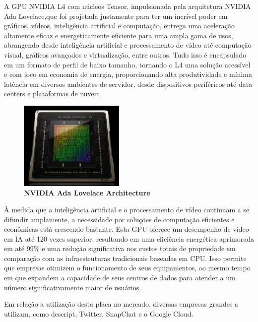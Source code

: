 \documentclass[conference]{IEEEtran}
\begin{document}
\par A GPU NVIDIA L4 com núcleos Tensor, impulsionada pela arquitetura NVIDIA Ada Lovelace,que foi projetada justamente para ter um incrível poder em gráficos, vídeos, inteligência artificial e computação, entrega uma aceleração altamente eficaz e energeticamente eficiente para uma ampla gama de usos, abrangendo desde inteligência artificial e processamento de vídeo até computação visual, gráficos avançados e virtualização, entre outros. Tudo isso é encapsulado em um formato de perfil de baixo tamanho, tornando o L4 uma solução acessível e com foco em economia de energia, proporcionando alta produtividade e mínima latência em diversos ambientes de servidor, desde dispositivos periféricos até data centers e plataformas de nuvem.



\begin{figure}[h]
\centerline{\includegraphics[width = 2.0in]{Screenshot 2023-08-21 190358.png}}
\caption{\textbf{NVIDIA Ada Lovelace Architecture}}
\label{figAM9300}
\end{figure}

 
\par À medida que a inteligência artificial e o processamento de vídeo continuam a se difundir amplamente, a necessidade por soluções de computação eficientes e econômicas está crescendo bastante. Esta GPU oferece um desempenho de vídeo em IA até 120 vezes superior, resultando em uma eficiência energética aprimorada em até 99\% e uma redução significativa nos custos totais de propriedade em comparação com as infraestruturas tradicionais baseadas em CPU. Isso permite que empresas otimizem o funcionamento de seus equipamentos, ao mesmo tempo em que expandem a capacidade de seus centros de dados para atender a um número significativamente maior de usuários.

\par Em relação a utilização desta placa no mercado, diversas empresas grandes a utilizam, como descript, Twitter, SnapChat e o Google Cloud.
\end{document}
